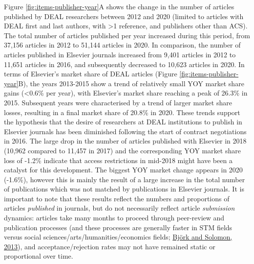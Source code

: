 \documentclass[
]{article}
\begin{document}
Figure \ref{fig:items-publisher-year}A shows the change in the number of articles published by DEAL researchers between 2012 and 2020 (limited to articles with DEAL first and last authors, with \textgreater1 reference, and publishers other than ACS). The total number of articles published per year increased during this period, from 37,156 articles in 2012 to 51,144 articles in 2020. In comparison, the number of
articles published in Elsevier journals increased from 9,401 articles in 2012 to 11,651 articles in 2016, and subsequently decreased to 10,623 articles in 2020. In terms of Elsevier's market share of DEAL articles (Figure \ref{fig:items-publisher-year}B), the years 2013-2015 show a trend of relatively small YOY market share gains (\textless0.6\% per year), with Elsevier's market share reaching a peak of 26.3\% in 2015. Subsequent years were characterised by a trend of larger market share losses, resulting in a final market share of 20.8\% in 2020. These trends support the hypothesis that the desire of researchers at DEAL institutions to publish in Elsevier journals has been diminished following the start of contract negotiations in 2016. The large drop in the number of articles published with Elsevier in 2018 (10,962 compared to 11,457 in 2017) and the corresponding YOY market share loss of -1.2\% indicate that access restrictions in mid-2018 might have been a catalyst for this development. The biggest YOY market change appears in 2020 (-1.6\%), however this is mainly the result of a large increase in the total number of publications which was not matched by publications in Elsevier journals. It is important to note that these results reflect the numbers and proportions of articles \emph{published} in journals, but do not necessarily reflect article \emph{submission} dynamics: articles take many months to proceed through peer-review and publication processes (and these processes are generally faster in STM fields versus social sciences/arts/humanities/economics fields; \href{https://doi.org/10.1016/j.joi.2013.09.001}{Björk and Solomon, 2013}), and acceptance/rejection rates may not have remained static or proportional over time.
\end{document}

